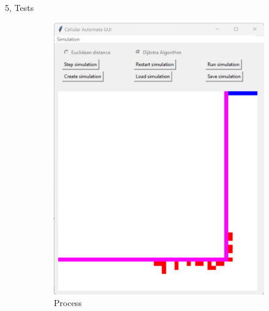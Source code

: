\documentclass[10pt,a4paper]{article}
\begin{document}
\begin{task}{5, Tests}
\begin{figure}[H]
\begin{subfigure}[b]{0.3\textwidth}
         \includegraphics[width=\textwidth]{images/1-rimea6b.png}
         \caption{Process}
         \label{fig:rimea6b}
     \end{subfigure}
     \centering
     \begin{subfigure}[b]{0.3\textwidth}
         \centering

\end{subfigure}
\end{figure}
\end{task}
\end{document}
